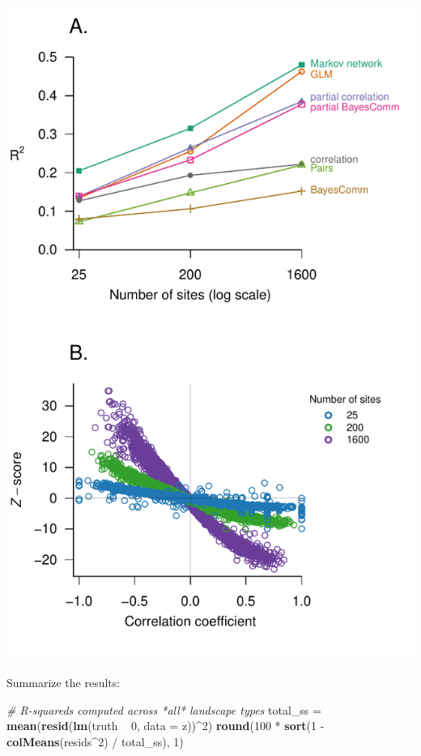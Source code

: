 \documentclass[11pt,]{article}
\newenvironment{Shaded}{\begin{snugshade}}{\end{snugshade}}
\newcommand{\KeywordTok}[1]{\textcolor[rgb]{0.13,0.29,0.53}{\textbf{{#1}}}}
\newcommand{\DataTypeTok}[1]{\textcolor[rgb]{0.13,0.29,0.53}{{#1}}}
\newcommand{\DecValTok}[1]{\textcolor[rgb]{0.00,0.00,0.81}{{#1}}}
\newcommand{\StringTok}[1]{\textcolor[rgb]{0.31,0.60,0.02}{{#1}}}
\newcommand{\CommentTok}[1]{\textcolor[rgb]{0.56,0.35,0.01}{\textit{{#1}}}}
\newcommand{\NormalTok}[1]{{#1}}
\begin{document}
\includegraphics{manuscript-materials/figures/performance.pdf}

Summarize the results:

\begin{Shaded}
\begin{Highlighting}[]
\CommentTok{# R-squareds computed across *all* landscape types}
\NormalTok{total_ss =}\StringTok{ }\KeywordTok{mean}\NormalTok{(}\KeywordTok{resid}\NormalTok{(}\KeywordTok{lm}\NormalTok{(truth ~}\StringTok{ }\DecValTok{0}\NormalTok{, }\DataTypeTok{data =} \NormalTok{z))^}\DecValTok{2}\NormalTok{)}
\KeywordTok{round}\NormalTok{(}\DecValTok{100} \NormalTok{*}\StringTok{ }\KeywordTok{sort}\NormalTok{(}\DecValTok{1} \NormalTok{-}\StringTok{ }\KeywordTok{colMeans}\NormalTok{(resids^}\DecValTok{2}\NormalTok{) /}\StringTok{ }\NormalTok{total_ss), }\DecValTok{1}\NormalTok{)}
\end{Highlighting}
\end{Shaded}
\end{document}

